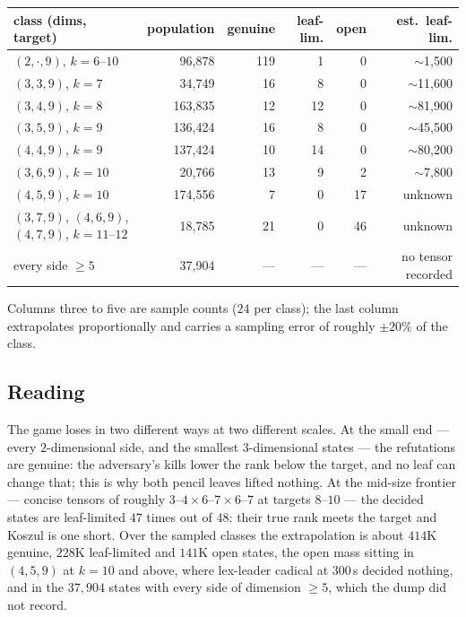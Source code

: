 \documentclass[11pt]{article}
\theoremstyle{definition}
\begin{document}
\begin{center}\small
\begin{tabular}{@{}lrrrrr@{}}
\toprule
class (dims, target) & population & genuine & leaf-lim. & open & est.\ leaf-lim. \\
\midrule
$(2,\cdot,9)$, $k=6$--$10$ & 96{,}878 & 119 & 1 & 0 & $\sim$1{,}500 \\
$(3,3,9)$, $k=7$ & 34{,}749 & 16 & 8 & 0 & $\sim$11{,}600 \\
$(3,4,9)$, $k=8$ & 163{,}835 & 12 & 12 & 0 & $\sim$81{,}900 \\
$(3,5,9)$, $k=9$ & 136{,}424 & 16 & 8 & 0 & $\sim$45{,}500 \\
$(4,4,9)$, $k=9$ & 137{,}424 & 10 & 14 & 0 & $\sim$80{,}200 \\
$(3,6,9)$, $k=10$ & 20{,}766 & 13 & 9 & 2 & $\sim$7{,}800 \\
$(4,5,9)$, $k=10$ & 174{,}556 & 7 & 0 & 17 & unknown \\
$(3,7,9)$, $(4,6,9)$, $(4,7,9)$, $k=11$--$12$ & 18{,}785 & 21 & 0 & 46 & unknown \\
every side $\ge 5$ & 37{,}904 & --- & --- & --- & no tensor recorded \\
\bottomrule
\end{tabular}
\end{center}
\normalsize
\noindent Columns three to five are sample counts ($24$ per class); the last
column extrapolates proportionally and carries a sampling error of roughly
$\pm 20\%$ of the class.

\subsection{Reading}

The game loses in two different ways at two different scales. At the small
end --- every $2$-dimensional side, and the smallest $3$-dimensional states
--- the refutations are genuine: the adversary's kills lower the rank below
the target, and no leaf can change that; this is why both pencil leaves
lifted nothing. At the mid-size frontier --- concise tensors of roughly
$3$--$4 \times 6$--$7 \times 6$--$7$ at targets $8$--$10$ --- the decided
states are leaf-limited $47$ times out of $48$: their true rank meets the
target and Koszul is one short. Over the sampled classes the extrapolation is
about $414$K genuine, $228$K leaf-limited and $141$K open states, the open
mass sitting in $(4,5,9)$ at $k=10$ and above, where lex-leader cadical at
$300$\,s decided nothing, and in the $37{,}904$ states with every side of
dimension $\ge 5$, which the dump did not record.
\end{document}
